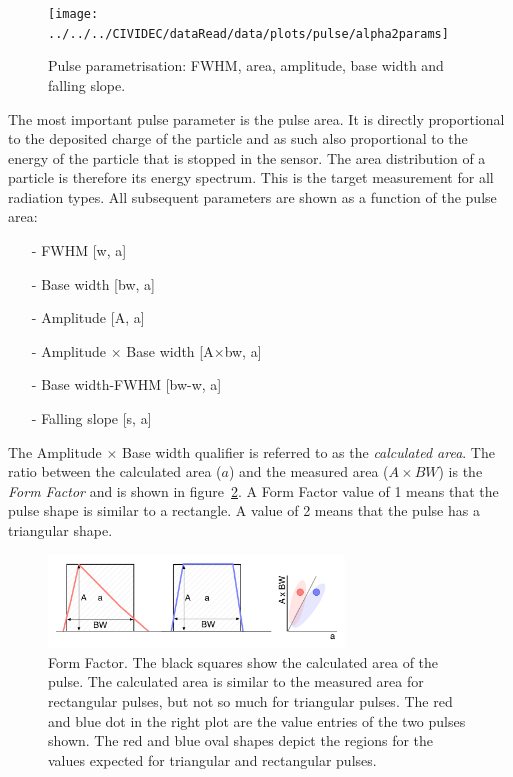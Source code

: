 \begin{figure}[!t]
\centering
\texttt{[image: ../../../CIVIDEC/dataRead/data/plots/pulse/alpha2params]}
\caption{Pulse parametrisation: FWHM, area, amplitude, base width and falling slope.}
\label{fig:params}
\end{figure}

The most important pulse parameter is the pulse area. It is directly proportional to the deposited charge of the particle and as such also proportional to the energy of the particle that is stopped in the sensor. The area distribution of a particle is therefore its energy spectrum. This is the target measurement for all radiation types. All subsequent parameters are shown as a function of the pulse area: 
\begin{itemize}\setlength\itemsep{0.1em}
\item[-] FWHM [w, a]
\item[-] Base width [bw, a]
\item[-] Amplitude [A, a]
\item[-] Amplitude $\times$ Base width [A$\times$bw, a]
\item[-] Base width-FWHM [bw-w, a]
\item[-] Falling slope [s, a]
\end{itemize}
The Amplitude $\times$ Base width qualifier is referred to as the \emph{calculated area}. The ratio between the calculated area ($a$) and the measured area ($A\times BW$) is the \emph{Form Factor} and is shown in figure~\ref{fig:formfac1}. A Form Factor value of 1 means that the pulse shape is similar to a rectangle. A value of 2 means that the pulse has a triangular shape. 



\begin{figure}[!t]
\centering
\includegraphics[width=0.7\textwidth]{05_current_monitoring/plots/formfac1}
\caption{Form Factor. The black squares show the calculated area of the pulse. The calculated area is similar to the measured area for rectangular pulses, but not so much for triangular pulses. The red and blue dot in the right plot are the value entries of the two pulses shown. The red and blue oval shapes depict the regions for the values expected for triangular and rectangular pulses. %
}
\label{fig:formfac1}
\end{figure}

